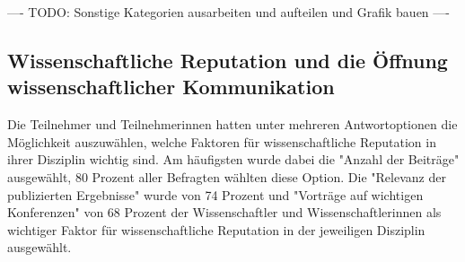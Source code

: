 ---- TODO: Sonstige Kategorien ausarbeiten und aufteilen und Grafik bauen ----

\subsection{Wissenschaftliche Reputation und die Öffnung wissenschaftlicher Kommunikation}

Die Teilnehmer und Teilnehmerinnen hatten unter mehreren Antwortoptionen die Möglichkeit auszuwählen, welche Faktoren für wissenschaftliche Reputation in ihrer Disziplin wichtig sind. Am häufigsten wurde dabei die "Anzahl der Beiträge" ausgewählt, 80 Prozent aller Befragten wählten diese Option. Die "Relevanz der publizierten Ergebnisse" wurde von 74 Prozent und "Vorträge auf wichtigen Konferenzen" von 68 Prozent der Wissenschaftler und Wissenschaftlerinnen als wichtiger Faktor für wissenschaftliche Reputation in der jeweiligen Disziplin ausgewählt.

